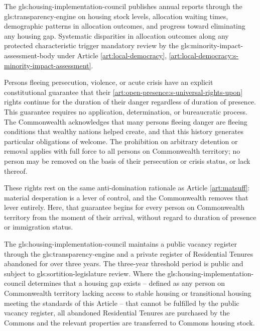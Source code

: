 The \gls{gls:housing-implementation-council} publishes annual reports through the \gls{gls:transparency-engine} on housing stock levels, allocation waiting times, demographic patterns in allocation outcomes, and progress toward eliminating any housing gap. Systematic disparities in allocation outcomes along any protected characteristic trigger mandatory review by the \gls{gls:minority-impact-assessment-body} under Article \ref{art:local-democracy}, \ref{art:local-democracy:s-minority-impact-assessment}.

Persons fleeing persecution, violence, or acute crisis have an explicit constitutional guarantee that their \ref{art:open-presence:s-universal-rights-upon} rights continue for the duration of their danger regardless of duration of presence. This guarantee requires no application, determination, or bureaucratic process. The Commonwealth acknowledges that many persons fleeing danger are fleeing conditions that wealthy nations helped create, and that this history generates particular obligations of welcome. The prohibition on arbitrary detention or removal applies with full force to all persons on Commonwealth territory; no person may be removed on the basis of their persecution or crisis status, or lack thereof.

These rights rest on the same anti-domination rationale as Article \ref{art:matsuff}: material desperation is a lever of control, and the Commonwealth removes that lever entirely. Here, that guarantee begins for every person on Commonwealth territory from the moment of their arrival, without regard to duration of presence or immigration status.

The \gls{gls:housing-implementation-council} maintains a public vacancy register through the \gls{gls:transparency-engine} and a private register of Residential Tenures abandoned for over three years. The three-year threshold period is public and subject to \gls{gls:sortition-legislature} review. Where the \gls{gls:housing-implementation-council} determines that a housing gap exists -- defined as any person on Commonwealth territory lacking access to stable housing or transitional housing meeting the standards of this Article -- that cannot be fulfilled by the public vacancy register, all abandoned Residential Tenures are purchased by the Commons and the relevant properties are transferred to Commons housing stock.

